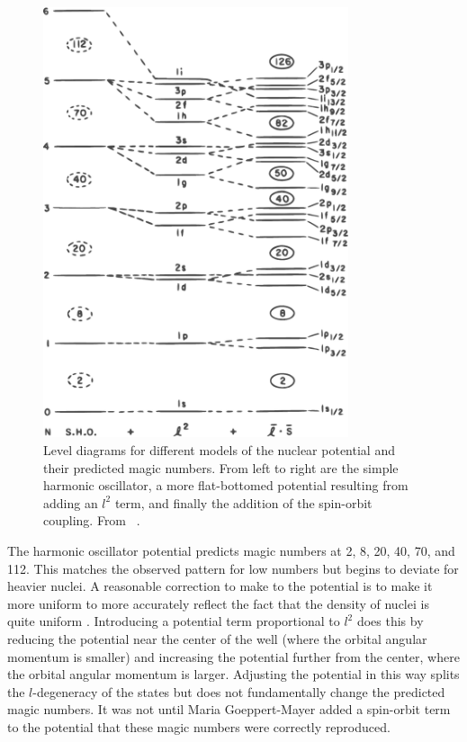 \begin{figure}[htp]
\centering
\includegraphics[width=0.8\textwidth]{figures/nuclearLevels.eps}
\caption{Level diagrams for different models of the nuclear potential and their predicted magic numbers.  From left to right are the simple harmonic oscillator, a more flat-bottomed potential resulting from adding an $l^2$ term, and finally the addition of the spin-orbit coupling.  From {}~\citep{Casten}.}
\label{fig:shellModelMagic}
\end{figure}
The harmonic oscillator potential predicts magic numbers at 2, 8, 20, 40, 70, and 112.  This matches the observed pattern for low numbers but begins to deviate for heavier nuclei.  A reasonable correction to make to the potential is to make it more uniform to more accurately reflect the fact that the density of nuclei is quite uniform \citep{Casten}.  Introducing a potential term proportional to $l^2$ does this by reducing the potential near the center of the well (where the orbital angular momentum is smaller) and increasing the potential further from the center, where the orbital angular momentum is larger.  Adjusting the potential in this way splits the $l$-degeneracy of the states but does not fundamentally change the predicted magic numbers.  It was not until Maria Goeppert-Mayer added a spin-orbit term to the potential \citep{MGM} that these magic numbers were correctly reproduced.  

